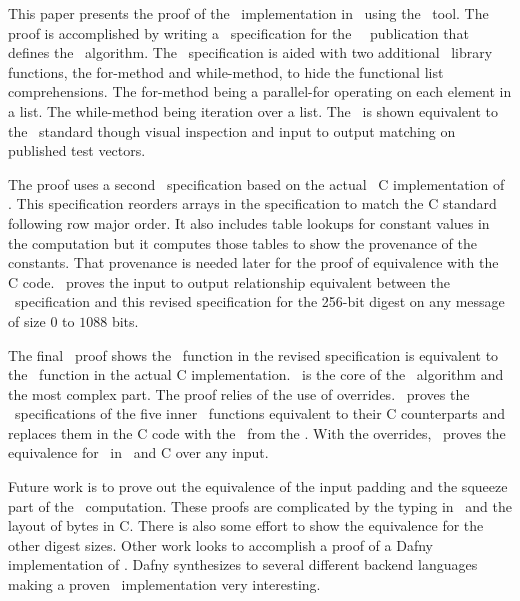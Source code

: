 This paper presents the proof of the \shaThree\ implementation in \openssl\ using the \saw\ tool.
The proof is accomplished by writing a \cryptol\ specification for the \nist\ \fips\ publication that defines the \shaThree\ algorithm.
The \cryptol\ specification is aided with two additional \cryptol\ library functions, the for-method and while-method, to hide the functional list comprehensions.
The for-method being a parallel-for operating on each element in a list.
The while-method being iteration over a list.
The \cryptol\ is shown equivalent to the \fips\ standard though visual inspection and input to output matching on published test vectors.

The proof uses a second \cryptol\ specification based on the actual \openssl\ C implementation of \shaThree.
This specification reorders arrays in the specification to match the C standard following row major order.
It also includes table lookups for constant values in the computation but it computes those tables to show the provenance of the constants.
That provenance is needed later for the proof of equivalence with the C code.
\saw\ proves the input to output relationship equivalent between the \fips\ specification and this revised specification for the 256-bit digest on any message of size $0$ to $1088$ bits.

The final \saw\ proof shows the \keccak\ function in the revised specification is equivalent to the \keccak\ function in the actual C implementation.
\keccak\ is the core of the \shaThree\ algorithm and the most complex part.
The proof relies of the use of overrides.
\saw\ proves the \cryptol\ specifications of the five inner \keccak\ functions equivalent to their C counterparts and replaces them in the C code with the \sawcore\ from the \cryptol.
With the overrides, \saw\ proves the equivalence for \keccak\ in \cryptol\ and C over any input.

Future work is to prove out the equivalence of the input padding and the squeeze part of the \shaThree\ computation.
These proofs are complicated by the typing in \cryptol\ and the layout of bytes in C.
There is also some effort to show the equivalence for the other digest sizes.
Other work looks to accomplish a proof of a Dafny implementation of \shaThree.
Dafny synthesizes to several different backend languages making a proven \shaThree\ implementation very interesting.
